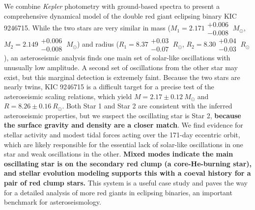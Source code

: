 We combine \emph{Kepler} photometry with ground-based spectra to present a comprehensive dynamical model of the double red giant eclipsing binary KIC 9246715. While the two stars are very similar in mass ($M_1 = 2.171\substack{+0.006 \\ -0.008} \ M_{\odot}$, $M_2 = 2.149\substack{+0.006 \\ -0.008} \ M_{\odot}$) and radius ($R_1 = 8.37\substack{+0.03 \\ -0.07} \ R_{\odot}$, $R_2 = 8.30\substack{+0.04 \\ -0.03} \ R_{\odot}$), an asteroseismic analysis finds one main set of solar-like oscillations with unusually low amplitude. A second set of oscillations from the other star may exist, but this marginal detection is extremely faint. Because the two stars are nearly twins, KIC 9246715 is a difficult target for a precise test of the asteroseismic scaling relations, which yield $M = 2.17\pm0.12 \ M_{\odot}$ and $R = 8.26\pm0.16 \ R_{\odot}$. Both Star 1 and Star 2 are consistent with the inferred asteroseismic properties, but we suspect the oscillating star is Star 2, \textbf{because the surface gravity and density are a closer match}. We find evidence for stellar activity and modest tidal forces acting over the 171-day eccentric orbit, which are likely responsible for the essential lack of solar-like oscillations in one star and weak oscillations in the other. \textbf{Mixed modes indicate the main oscillating star is on the secondary red clump (a core-He-burning star), and stellar evolution modeling supports this with a coeval history for a pair of red clump stars.} This system is a useful case study and paves the way for a detailed analysis of more red giants in eclipsing binaries, an important benchmark for asteroseismology.
  
  
  
  
  
